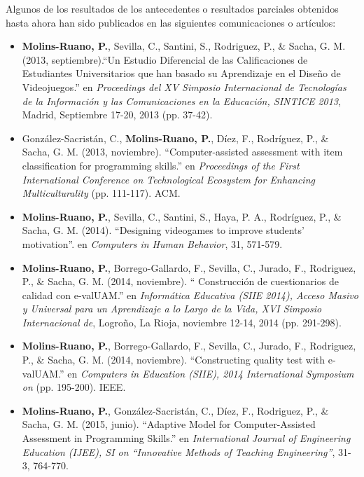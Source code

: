 Algunos de los resultados de los antecedentes o resultados parciales obtenidos hasta ahora han sido publicados en las siguientes comunicaciones o artículos:

\begin{itemize}
	\item  \textbf{Molins-Ruano, P.}, Sevilla, C., Santini, S., Rodriguez, P., \& Sacha, G. M. (2013, septiembre).``Un Estudio Diferencial de las Calificaciones de Estudiantes Universitarios que han basado su Aprendizaje en el Diseño de Videojuegos.'' en \textit{Proceedings del XV Simposio Internacional de Tecnologías de la Información y las Comunicaciones en la Educación, SINTICE 2013}, Madrid, Septiembre 17-20, 2013 (pp. 37-42).
	
	\item González-Sacristán, C., \textbf{Molins-Ruano, P.}, Díez, F., Rodríguez, P., \& Sacha, G. M. (2013, noviembre). ``Computer-assisted assessment with item classification for programming skills.'' en \textit{Proceedings of the First International Conference on Technological Ecosystem for Enhancing Multiculturality} (pp. 111-117). ACM.
	
	\item \textbf{Molins-Ruano, P.}, Sevilla, C., Santini, S., Haya, P. A., Rodríguez, P., \& Sacha, G. M. (2014). ``Designing videogames to improve students' motivation''. en \textit{Computers in Human Behavior}, 31, 571-579.
	
	\item \textbf{Molins-Ruano, P.}, Borrego-Gallardo, F., Sevilla, C., Jurado, F., Rodriguez, P., \& Sacha, G. M. (2014, noviembre). `` Construcción de cuestionarios de calidad con e-valUAM.'' en \textit{Informática Educativa (SIIE 2014), Acceso Masivo y Universal para un Aprendizaje a lo Largo de la Vida, XVI Simposio Internacional de},  Logroño, La Rioja, noviembre 12-14, 2014 (pp. 291-298).

	\item \textbf{Molins-Ruano, P.}, Borrego-Gallardo, F., Sevilla, C., Jurado, F., Rodriguez, P., \& Sacha, G. M. (2014, noviembre). ``Constructing quality test with e-valUAM.'' en \textit{Computers in Education (SIIE), 2014 International Symposium on} (pp. 195-200). IEEE.
	
	\newpage
	\item \textbf{Molins-Ruano, P.}, González-Sacristán, C., Díez, F., Rodriguez, P., \& Sacha, G. M. (2015, junio). ``Adaptive Model for Computer-Assisted Assessment in Programming Skills.'' en \textit{International Journal of Engineering Education (IJEE), SI on ``Innovative Methods of Teaching Engineering''}, 31-3, 764-770.
\end{itemize}

